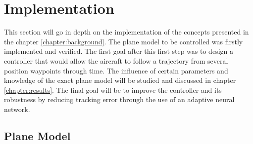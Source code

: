 
\chapter{Implementation}
\label{chapter:implementation}

This section will go in depth on the implementation of the concepts presented in the chapter \ref{chapter:background}. The plane model to be controlled was firstly implemented and verified. The first goal after this first step was to design a controller that would allow the aircraft to follow a trajectory from several position waypoints through time. The influence of certain parameters and knowledge of the exact plane model will be studied and discussed in chapter \ref{chapter:results}. The final goal will be to improve the controller and its robustness by reducing tracking error through the use of an adaptive neural network.

\section{Plane Model}
\label{section:model}

